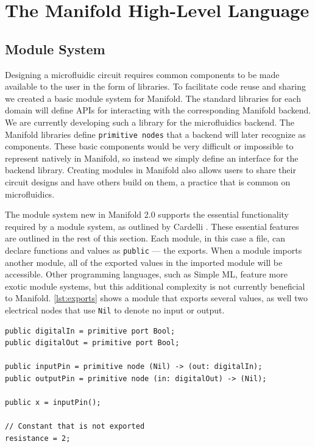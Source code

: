 \section{The Manifold High-Level Language}

\subsection{Module System}

Designing a microfluidic circuit requires common components to be made available to the user in the 
form of libraries. To facilitate code reuse and sharing we created a basic module system for Manifold.
The standard libraries for each domain will define APIs for interacting with the corresponding Manifold
backend. We are currently developing such a library for the microfluidics backend. The Manifold libraries
define \texttt{primitive nodes} that a backend will later recognize as components. These basic
components would be very difficult or impossible to represent natively in Manifold,
so instead we simply define an interface for the backend library. Creating
modules in Manifold also allows users to share their circuit designs and have
others build on them, a practice that is common on microfluidics.

The module system new in Manifold 2.0 supports the essential functionality required by a module system,
as outlined by Cardelli \cite{Cardelli:1997:PFL:263699.263735}. These
essential features are outlined in the rest of this section. Each module, in this case a file, can
declare functions and values as \texttt{public} --- the exports. When a module imports another
module, all of the exported values in the imported module will be
accessible. Other programming languages, such as Simple ML, feature more exotic module systems, but this
additional complexity is not currently beneficial to Manifold. \autoref{lst:exports} shows a module
that exports several values, as well two
electrical nodes that use \texttt{Nil} to denote no input or output.

\begin{lstlisting}[label=lst:exports, caption=Exported values in a Manifold file]
public digitalIn = primitive port Bool;
public digitalOut = primitive port Bool;

public inputPin = primitive node (Nil) -> (out: digitalIn);
public outputPin = primitive node (in: digitalOut) -> (Nil);

public x = inputPin();

// Constant that is not exported
resistance = 2;
\end{lstlisting}


